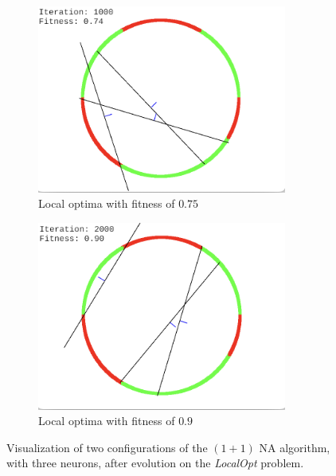 \begin{figure}
    \centering
    \begin{subfigure}{0.45\textwidth}
        \centering
        \includegraphics[width=0.9\textwidth]{Pictures/localopt_75}
       \caption{Local optima with fitness of $0.75$}
    \end{subfigure}\hfill
    \begin{subfigure}{0.45\textwidth}
        \centering
        \includegraphics[width=0.9\textwidth]{Pictures/localopt_90}
        \caption{Local optima with fitness of $0.9$}
    \end{subfigure}
    \caption{Visualization of two configurations of the $(1 + 1)$ NA algorithm, with three neurons, after evolution on the \textit{LocalOpt} problem.}
    \label{fig:na_localopt_visual}
\end{figure}

